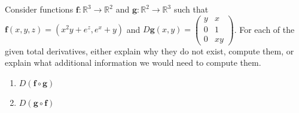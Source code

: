 \begin{problem}
Consider functions $\mathbf{f}:\mathbb{R}^3\rightarrow\mathbb{R}^2$ and $\mathbf{g}:\mathbb{R}^2\rightarrow\mathbb{R}^3$ such that $\mathbf{f}(x,y,z) = (x^2y+e^z, e^x+y)$ and $D\mathbf{g}(x,y) = \left(\begin{array}{ccc}y&x\\0&1\\0&xy\end{array}\right)$. For each of the given total derivatives, either explain why they do not exist, compute them, or explain what additional information we would need to compute them.
\begin{enumerate}
\item $D(\mathbf{f}\circ\mathbf{g})$
\item $D(\mathbf{g}\circ\mathbf{f})$
\end{enumerate}
\end{problem}